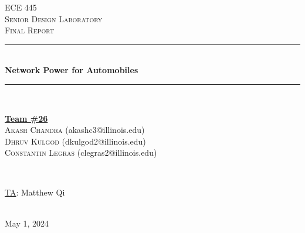 \documentclass[12pt]{article}
\begin{document}
\begin{titlepage}
    \newcommand{\HRule}{\rule{\linewidth}{0.1mm}}
    \center %

    \textsc{\Large ECE 445}\\[0.5cm] %
    \textsc{\large Senior Design Laboratory}\\[0.5cm] %
    \textsc{\Large Final Report }\\[0.5cm] %

    \HRule \\[0.5cm]
    \huge \textbf{Network Power for Automobiles} %
    \HRule \\[2cm]

    \begin{minipage}{0.5\textwidth}
        \begin{center} \large
            \underline{\textbf{Team \#26}} \\ \medskip
            \textsc{Akash Chandra} (akashc3@illinois.edu) \\
            \textsc{Dhruv Kulgod} (dkulgod2@illinois.edu) \\
            \textsc{Constantin Legras} (clegras2@illinois.edu) \\
        \end{center}
    \end{minipage} \\[1.5cm]

    \begin{minipage}{0.5\textwidth}
        \begin{center}
            \large
            \underline{TA}: Matthew Qi
        \end{center}
    \end{minipage} \\[1cm]

    {\large May 1, 2024} %

    \vfill %

\end{titlepage}
\setcounter{page}{2}
\clearpage
\tableofcontents
\newpage
\end{document}
